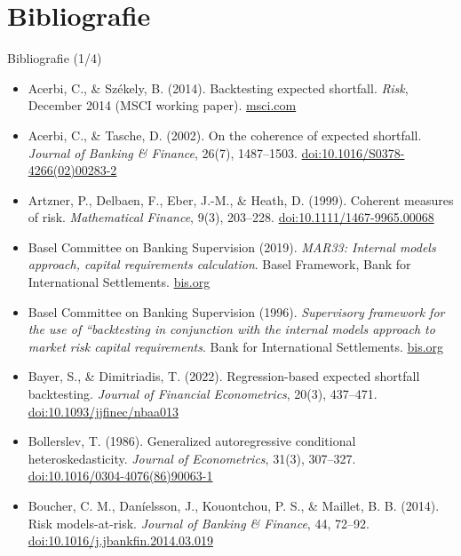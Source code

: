 \section{Bibliografie}

\begin{frame}{Bibliografie (1/4)}
\itemsize{\tiny}
\begin{itemize}
    \item Acerbi, C., \& Székely, B. (2014). Backtesting expected shortfall. \textit{Risk}, December 2014 (MSCI working paper). \href{https://www.msci.com/documents/10199/22aa9922-f874-4060-b77a-0f0e267a489b}{msci.com}
    \item Acerbi, C., \& Tasche, D. (2002). On the coherence of expected shortfall. \textit{Journal of Banking \& Finance}, 26(7), 1487--1503. \href{https://doi.org/10.1016/S0378-4266(02)00283-2}{doi:10.1016/S0378-4266(02)00283-2}
    \item Artzner, P., Delbaen, F., Eber, J.-M., \& Heath, D. (1999). Coherent measures of risk. \textit{Mathematical Finance}, 9(3), 203--228. \href{https://doi.org/10.1111/1467-9965.00068}{doi:10.1111/1467-9965.00068}
    \item Basel Committee on Banking Supervision (2019). \textit{MAR33: Internal models approach, capital requirements calculation}. Basel Framework, Bank for International Settlements. \href{https://www.bis.org/basel_framework/chapter/MAR/33.htm}{bis.org}
    \item Basel Committee on Banking Supervision (1996). \textit{Supervisory framework for the use of ``backtesting in conjunction with the internal models approach to market risk capital requirements}. Bank for International Settlements. \href{https://www.bis.org/publ/bcbs22.htm}{bis.org}
    \item Bayer, S., \& Dimitriadis, T. (2022). Regression-based expected shortfall backtesting. \textit{Journal of Financial Econometrics}, 20(3), 437--471. \href{https://doi.org/10.1093/jjfinec/nbaa013}{doi:10.1093/jjfinec/nbaa013}
    \item Bollerslev, T. (1986). Generalized autoregressive conditional heteroskedasticity. \textit{Journal of Econometrics}, 31(3), 307--327. \href{https://doi.org/10.1016/0304-4076(86)90063-1}{doi:10.1016/0304-4076(86)90063-1}
    \item Boucher, C. M., Daníelsson, J., Kouontchou, P. S., \& Maillet, B. B. (2014). Risk models-at-risk. \textit{Journal of Banking \& Finance}, 44, 72--92. \href{https://doi.org/10.1016/j.jbankfin.2014.03.019}{doi:10.1016/j.jbankfin.2014.03.019}

\end{itemize}
\end{frame}
